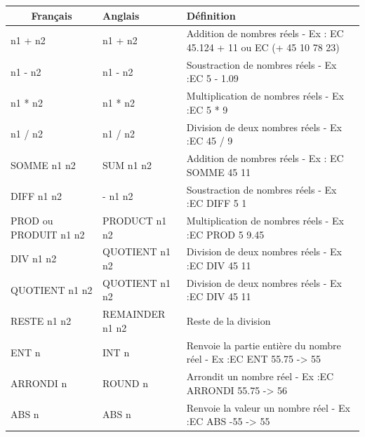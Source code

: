 \begin{table}[htb]
\begin{changemargin}{-3cm}{-3cm}
\begin{tabular}{|l|l|l|}
\hline
\multicolumn{1}{|c|}{Français} & Anglais         & Définition                                                            \\ \hline
n1 + n2                        & n1 + n2         & Addition de nombres réels - Ex : EC 45.124 + 11 ou EC (+ 45 10 78 23) \\ \hline
n1 - n2                        & n1 - n2         & Soustraction de nombres réels - Ex :EC 5 - 1.09                       \\ \hline
n1 * n2                        & n1 * n2         & Multiplication de nombres réels - Ex :EC 5 * 9                        \\ \hline
n1 / n2                        & n1 / n2         & Division de deux nombres réels - Ex :EC 45 / 9                        \\ \hline
SOMME n1 n2                    & SUM n1 n2       & Addition de nombres réels - Ex : EC SOMME 45 11                       \\ \hline
DIFF n1 n2                     & - n1 n2         & Soustraction de nombres réels - Ex :EC DIFF 5 1                       \\ \hline
PROD ou PRODUIT n1 n2          & PRODUCT n1 n2   & Multiplication de nombres réels - Ex :EC PROD 5 9.45                  \\ \hline
DIV n1 n2                      & QUOTIENT n1 n2  & Division de deux nombres réels - Ex :EC DIV 45 11                     \\ \hline
QUOTIENT n1 n2                 & QUOTIENT n1 n2  & Division de deux nombres réels - Ex :EC DIV 45 11                     \\ \hline
RESTE n1 n2                    & REMAINDER n1 n2 & Reste de la division                                                  \\ \hline
ENT n                          & INT n           & Renvoie la partie entière du nombre réel - Ex :EC ENT 55.75 -> 55      \\ \hline
ARRONDI n                      & ROUND n         & Arrondit un nombre réel - Ex :EC ARRONDI 55.75 -> 56                   \\ \hline
ABS n                          & ABS n           & Renvoie la valeur un nombre réel - Ex :EC ABS -55 -> 55                \\ \hline

\end{tabular}
\end{changemargin}
\end{table}
